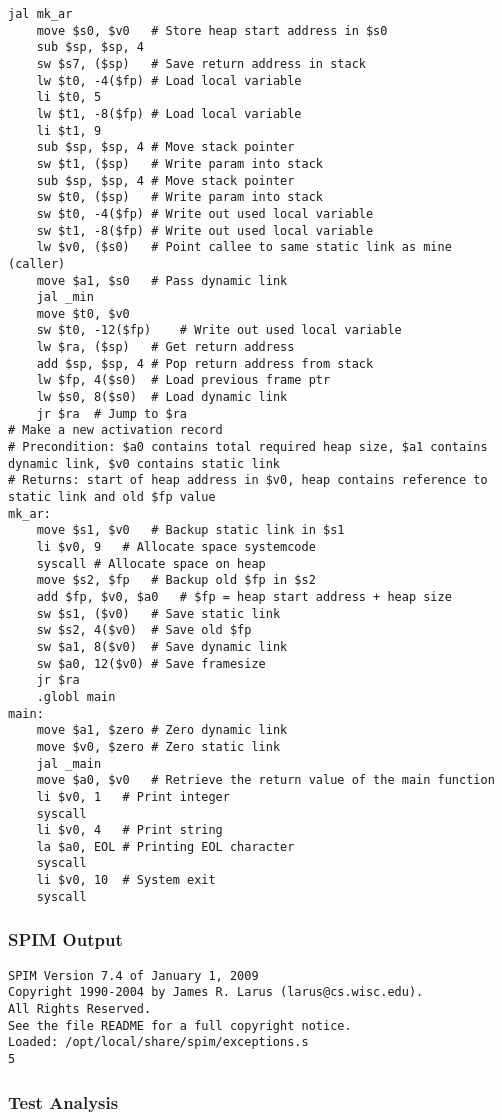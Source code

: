 \begin{lstlisting}[showstringspaces=false,breaklines=true,backgroundcolor=\color{light-gray}, captionpos=b]
	jal mk_ar
	move $s0, $v0	# Store heap start address in $s0
	sub $sp, $sp, 4
	sw $s7, ($sp)	# Save return address in stack
	lw $t0, -4($fp)	# Load local variable
	li $t0, 5
	lw $t1, -8($fp)	# Load local variable
	li $t1, 9
	sub $sp, $sp, 4	# Move stack pointer
	sw $t1, ($sp)	# Write param into stack
	sub $sp, $sp, 4	# Move stack pointer
	sw $t0, ($sp)	# Write param into stack
	sw $t0, -4($fp)	# Write out used local variable
	sw $t1, -8($fp)	# Write out used local variable
	lw $v0, ($s0)	# Point callee to same static link as mine (caller)
	move $a1, $s0	# Pass dynamic link
	jal _min
	move $t0, $v0
	sw $t0, -12($fp)	# Write out used local variable
	lw $ra, ($sp)	# Get return address
	add $sp, $sp, 4	# Pop return address from stack
	lw $fp, 4($s0)	# Load previous frame ptr
	lw $s0, 8($s0)	# Load dynamic link
	jr $ra	# Jump to $ra
# Make a new activation record
# Precondition: $a0 contains total required heap size, $a1 contains dynamic link, $v0 contains static link
# Returns: start of heap address in $v0, heap contains reference to static link and old $fp value
mk_ar:
	move $s1, $v0	# Backup static link in $s1
	li $v0, 9	# Allocate space systemcode
	syscall	# Allocate space on heap
	move $s2, $fp	# Backup old $fp in $s2
	add $fp, $v0, $a0	# $fp = heap start address + heap size
	sw $s1, ($v0)	# Save static link
	sw $s2, 4($v0)	# Save old $fp
	sw $a1, 8($v0)	# Save dynamic link
	sw $a0, 12($v0)	# Save framesize
	jr $ra
	.globl main
main:
	move $a1, $zero	# Zero dynamic link
	move $v0, $zero	# Zero static link
	jal _main
	move $a0, $v0	# Retrieve the return value of the main function
	li $v0, 1	# Print integer
	syscall
	li $v0, 4	# Print string
	la $a0, EOL	# Printing EOL character
	syscall
	li $v0, 10	# System exit
	syscall

\end{lstlisting}\subsubsection{SPIM Output}
\begin{verbatim}
SPIM Version 7.4 of January 1, 2009
Copyright 1990-2004 by James R. Larus (larus@cs.wisc.edu).
All Rights Reserved.
See the file README for a full copyright notice.
Loaded: /opt/local/share/spim/exceptions.s
5
\end{verbatim}\subsubsection{Test Analysis}

